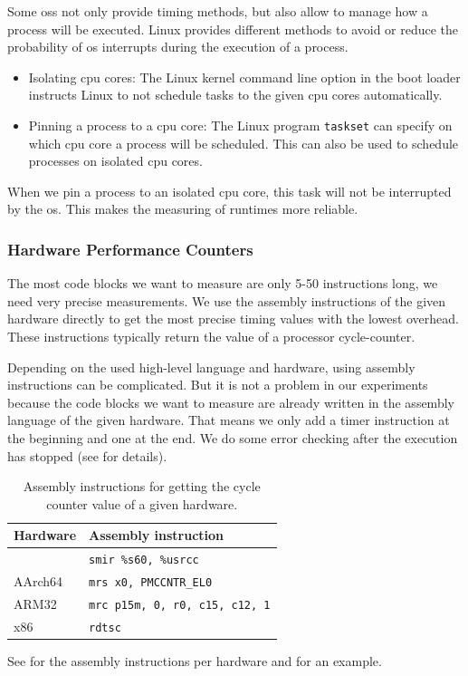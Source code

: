 Some \acp{os} not only provide timing methods, but also allow to manage how a process will be executed.
Linux provides different methods to avoid or reduce the probability of \ac{os} interrupts during the execution of a process.
\begin{itemize}
    \item Isolating \ac{cpu} cores: 
    The Linux kernel command line option \mbox{} in the boot loader instructs Linux to not schedule tasks to the given \ac{cpu} cores automatically.
    \item Pinning a process to a \ac{cpu} core: 
    The Linux program \lstinline|taskset| can specify on which \ac{cpu} core a process will be scheduled.
    This can also be used to schedule processes on isolated \ac{cpu} cores.
\end{itemize}
When we pin a process to an isolated \ac{cpu} core, this task will not be interrupted by the \ac{os}.
This makes the measuring of runtimes more reliable.

\subsubsection{Hardware Performance Counters}
\label{sec:approach:hwpercounter}
The most code blocks we want to measure are only 5-50 instructions long, \ie we need very precise measurements.
We use the assembly instructions of the given hardware directly to get the most precise timing values with the lowest overhead.
These instructions typically return the value of a processor cycle-counter.

Depending on the used high-level language and hardware, using assembly instructions can be complicated.
But it is not a problem in our experiments because the code blocks we want to measure are already written in the assembly language of the given hardware.
That means we only add a timer instruction at the beginning and one at the end.
We do some error checking after the execution has stopped (see  for details).
\begin{table}
    \centering
    \begin{tabular}{@{}ll@{}}
        \toprule
        Hardware & Assembly instruction \\
        \midrule
        \aurora{} & \lstinline|smir %s60, %usrcc| \\
        AArch64 & \lstinline|mrs x0, PMCCNTR_EL0| \\
        ARM32 & \lstinline|mrc p15m, 0, r0, c15, c12, 1| \\
        x86 & \lstinline|rdtsc| \\
        \bottomrule
    \end{tabular}
    \caption[Assembly Instructions for Getting the Cycle Counter Value of a Given Hardware]{Assembly instructions for getting the cycle counter value of a given hardware.}
    \label{tab:approach:asm_instrs_timing}
\end{table}
See  for the assembly instructions per hardware and  for an example.

